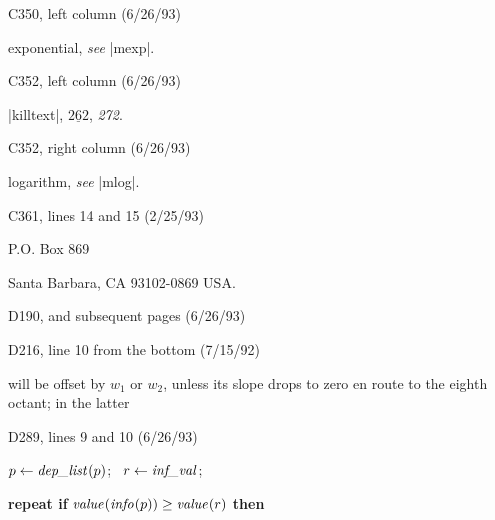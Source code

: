 \bugonpage C350, left column (6/26/93)

\eightpoint
exponential, {\sl see\/} |mexp|.

\bugonpage C352, left column (6/26/93)

\eightpoint
|killtext|, $\underline{262}$, {\it 272}.

\bugonpage C352, right column (6/26/93)

\eightpoint
logarithm, {\sl see\/} |mlog|.

\bugonpage C361, lines 14 and 15 (2/25/93)

P.O. Box 869\par
Santa Barbara, CA 93102-0869 USA.


\hsize=35pc
\def\\#1{\hbox{\it#1\/\kern.05em}} %
\def\to{\mathrel{.\,.}} %

\bugonpage D190, and subsequent pages (6/26/93)


\bugonpage D216, line 10 from the bottom (7/15/92)

\tenpoint\noindent
will be offset by $w_1$ or $w_2$, unless its slope drops to zero
en route to the eighth octant; in the latter\cutpar

\bugonpage D289, lines 9 and 10 (6/26/93)

\ninepoint\noindent\hskip20pt
$p\gets\\{dep\_list}(p)$; \ $r\gets\\{inf\_val}$;\par\noindent\hskip20pt
{\bf repeat if\/} $\\{value}(\\{info}(p))\ge\\{value}(r)$ {\bf then}

\hsize=29pc
\def\dashto{\mathrel{\hbox{-\kern-.05em}\mkern3.9mu\hbox{-\kern-.05em}}}


\bye

